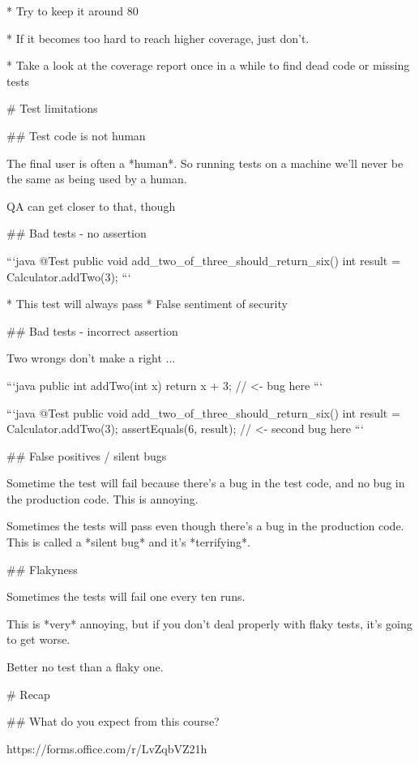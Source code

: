 * Try to keep it around 80%

* If it becomes too hard to reach higher coverage, just don't.

* Take a look at the coverage report once in a while to
  find dead code or missing tests

# Test limitations

## Test code is not human

The final user is often a *human*. So running tests on a machine we'll never
be the same as being used by a human.

QA can get closer to that, though

## Bad tests - no assertion


```java
@Test
public void add_two_of_three_should_return_six() {
    int result = Calculator.addTwo(3);
}
```

* This test will always pass
* False sentiment of security

## Bad tests - incorrect assertion

Two wrongs don't make a right ...


```java
public int addTwo(int x)  {
    return x + 3; // <- bug here
}
```

```java
@Test
public void add_two_of_three_should_return_six() {
    int result = Calculator.addTwo(3);
    assertEquals(6, result); // <- second bug here
}
```

## False positives / silent bugs

Sometime the test will fail because there's a bug in the test code, and no bug
in the production code. This is annoying.

\vfill

Sometimes the tests will pass even though there's a bug in the production code.
This is called a *silent bug* and it's *terrifying*.


## Flakyness

Sometimes the tests will fail one every ten runs.

This is *very* annoying, but if you don't deal properly with flaky tests, it's going to get worse.

Better no test than a flaky one.

# Recap

## What do you expect from this course?

https://forms.office.com/r/LvZqbVZ21h
